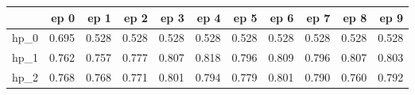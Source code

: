 \begin{tabular}{lrrrrrrrrrr}
\toprule
{} &   ep 0 &   ep 1 &   ep 2 &   ep 3 &   ep 4 &   ep 5 &   ep 6 &   ep 7 &   ep 8 &   ep 9 \\
\midrule
hp\_0 &  0.695 &  0.528 &  0.528 &  0.528 &  0.528 &  0.528 &  0.528 &  0.528 &  0.528 &  0.528 \\
hp\_1 &  0.762 &  0.757 &  0.777 &  0.807 &  0.818 &  0.796 &  0.809 &  0.796 &  0.807 &  0.803 \\
hp\_2 &  0.768 &  0.768 &  0.771 &  0.801 &  0.794 &  0.779 &  0.801 &  0.790 &  0.760 &  0.792 \\
\bottomrule
\end{tabular}
